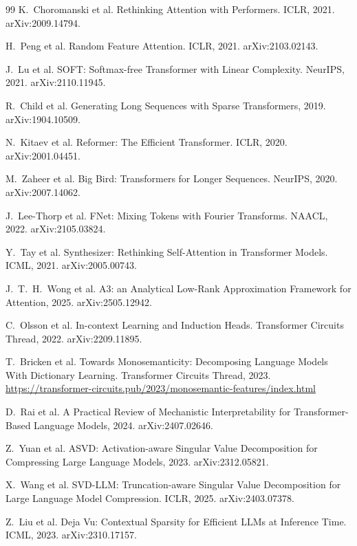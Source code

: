 \begin{thebibliography}{99}
K.~Choromanski et al. Rethinking Attention with Performers. ICLR, 2021.
arXiv:2009.14794.

H.~Peng et al. Random Feature Attention. ICLR, 2021. arXiv:2103.02143.

J.~Lu et al. SOFT: Softmax-free Transformer with Linear Complexity.
NeurIPS, 2021. arXiv:2110.11945.

R.~Child et al. Generating Long Sequences with Sparse Transformers, 2019.
arXiv:1904.10509.

N.~Kitaev et al. Reformer: The Efficient Transformer. ICLR, 2020.
arXiv:2001.04451.

M.~Zaheer et al. Big Bird: Transformers for Longer Sequences. NeurIPS,
2020. arXiv:2007.14062.

J.~Lee-Thorp et al. FNet: Mixing Tokens with Fourier Transforms.
NAACL, 2022. arXiv:2105.03824.

Y.~Tay et al. Synthesizer: Rethinking Self-Attention in Transformer
Models. ICML, 2021. arXiv:2005.00743.

J.~T.~H.~Wong et al. A3: an Analytical Low-Rank Approximation Framework
for Attention, 2025. arXiv:2505.12942.

C.~Olsson et al. In-context Learning and Induction Heads. Transformer
Circuits Thread, 2022. arXiv:2209.11895.

T.~Bricken et al. Towards Monosemanticity: Decomposing Language Models
With Dictionary Learning. Transformer Circuits Thread, 2023.
\url{https://transformer-circuits.pub/2023/monosemantic-features/index.html}

D.~Rai et al. A Practical Review of Mechanistic Interpretability for
Transformer-Based Language Models, 2024. arXiv:2407.02646.

Z.~Yuan et al. ASVD: Activation-aware Singular Value Decomposition for
Compressing Large Language Models, 2023. arXiv:2312.05821.

X.~Wang et al. SVD-LLM: Truncation-aware Singular Value Decomposition for
Large Language Model Compression. ICLR, 2025. arXiv:2403.07378.

Z.~Liu et al. Deja Vu: Contextual Sparsity for Efficient LLMs at Inference
Time. ICML, 2023. arXiv:2310.17157.


\end{thebibliography}
